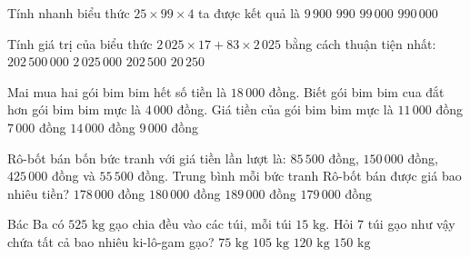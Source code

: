\begin{ex} %
Tính nhanh biểu thức $25 \times 99 \times 4$ ta được kết quả là
\choice
{\True $9\,900$}
{$990$}
{$99\,000$}
{$990\,000$}
\end{ex}

\begin{ex} %
Tính giá trị của biểu thức $2\,025 \times 17 + 83 \times 2\,025$ bằng cách thuận tiện nhất:
\choice
{$202\,500\,000$}
{$2\,025\,000$}
{\True $202\,500$}
{$20\,250$}
\end{ex}

\begin{ex} %
Mai mua hai gói bim bim hết số tiền là $18\,000$ đồng. Biết gói bim bim cua đắt hơn gói bim bim mực là $4\,000$ đồng. Giá tiền của gói bim bim mực là
\choice
{$11\,000$ đồng}
{\True $7\,000$ đồng}
{$14\,000$ đồng}
{$9\,000$ đồng}
\end{ex}

\begin{ex} %
Rô-bốt bán bốn bức tranh với giá tiền lần lượt là: $85\,500$ đồng, $150\,000$ đồng, $425\,000$ đồng và $55\,500$ đồng. Trung bình mỗi bức tranh Rô-bốt bán được giá bao nhiêu tiền?
\choice
{$178\,000$ đồng}
{$180\,000$ đồng}
{$189\,000$ đồng}
{\True $179\,000$ đồng}
\end{ex}

\begin{ex} %
Bác Ba có $525\text{ kg}$ gạo chia đều vào các túi, mỗi túi $15\text{ kg}$. Hỏi $7$ túi gạo như vậy chứa tất cả bao nhiêu ki-lô-gam gạo?
\choice
{$75\text{ kg}$}
{\True $105\text{ kg}$}
{$120\text{ kg}$}
{$150\text{ kg}$}
\end{ex}

